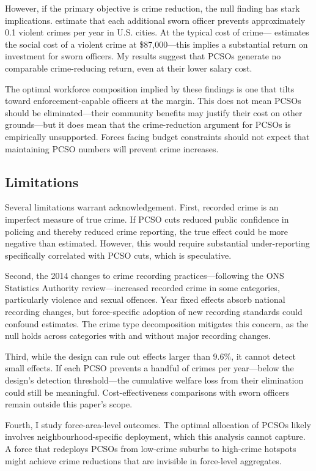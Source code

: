 \documentclass[12pt]{article}
\begin{document}
However, if the primary objective is crime reduction, the null finding has stark implications. \citet{chalfin2018certainty} estimate that each additional sworn officer prevents approximately 0.1 violent crimes per year in U.S. cities. At the typical cost of crime---\citet{heaton2016hidden} estimates the social cost of a violent crime at \$87,000---this implies a substantial return on investment for sworn officers. My results suggest that PCSOs generate no comparable crime-reducing return, even at their lower salary cost.

The optimal workforce composition implied by these findings is one that tilts toward enforcement-capable officers at the margin. This does not mean PCSOs should be eliminated---their community benefits may justify their cost on other grounds---but it does mean that the crime-reduction argument for PCSOs is empirically unsupported. Forces facing budget constraints should not expect that maintaining PCSO numbers will prevent crime increases.

\subsection{Limitations}

Several limitations warrant acknowledgement. First, recorded crime is an imperfect measure of true crime. If PCSO cuts reduced public confidence in policing and thereby reduced crime reporting, the true effect could be more negative than estimated. However, this would require substantial under-reporting specifically correlated with PCSO cuts, which is speculative.

Second, the 2014 changes to crime recording practices---following the ONS Statistics Authority review---increased recorded crime in some categories, particularly violence and sexual offences. Year fixed effects absorb national recording changes, but force-specific adoption of new recording standards could confound estimates. The crime type decomposition mitigates this concern, as the null holds across categories with and without major recording changes.

Third, while the design can rule out effects larger than 9.6\%, it cannot detect small effects. If each PCSO prevents a handful of crimes per year---below the design's detection threshold---the cumulative welfare loss from their elimination could still be meaningful. Cost-effectiveness comparisons with sworn officers remain outside this paper's scope.

Fourth, I study force-area-level outcomes. The optimal allocation of PCSOs likely involves neighbourhood-specific deployment, which this analysis cannot capture. A force that redeploys PCSOs from low-crime suburbs to high-crime hotspots might achieve crime reductions that are invisible in force-level aggregates.
\end{document}
